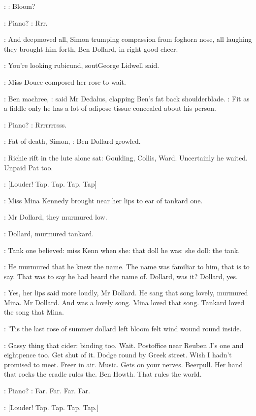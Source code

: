 :
\Stage:
Bloom?

\Stage:
Piano?
:
Rrr.

:
And deepmoved all, Simon trumping compassion from foghorn nose,
all laughing they brought him forth, Ben Dollard, in right good cheer.

\Lidwell:
You're looking rubicund,
sout{George Lidwell said.}

:
Miss Douce composed her rose to wait.

\Simon:
Ben machree,
:
said Mr Dedalus, clapping Ben's fat back shoulderblade.
\Simon:
Fit as a fiddle only he has a lot of adipose tissue concealed about his
person.

\Stage:
Piano?
:
Rrrrrrrsss.

\Dollard:
Fat of death, Simon,
:
Ben Dollard growled.

:
Richie rift in the lute alone sat: Goulding, Collis, Ward. Uncertainly
he waited. Unpaid Pat too.

\Stripling:
[Louder! Tap. Tap. Tap. Tap]

:
Miss Mina Kennedy brought near her lips to ear of tankard one.

:
Mr Dollard, they murmured low.

:
Dollard, murmured tankard.

:
Tank one believed:
miss Kenn when she: that doll he was: she doll:
the tank.

:
He murmured that he knew the name. The name was familiar to him,
that is to say. That was to say he had heard the name of. Dollard, was it?
Dollard, yes.

:
Yes, her lips said more loudly, Mr Dollard. He sang that song lovely,
murmured Mina. Mr Dollard. And
 was a lovely
song. Mina loved that song. Tankard loved the song that Mina.

:
'Tis the last rose of summer dollard left bloom felt wind wound round
inside.

\BloomInt:
Gassy thing that cider: binding too.
Wait. Postoffice near Reuben J's
one and eightpence too. Get shut of it. Dodge round by Greek street. Wish
I hadn't promised to meet. Freer in air. Music. Gets on your nerves.
Beerpull. Her hand that rocks the cradle rules the. Ben Howth. That rules
the world.

\Stage:
Piano?
:
Far. Far. Far. Far.

\Stripling:
[Louder! Tap. Tap. Tap. Tap.]

